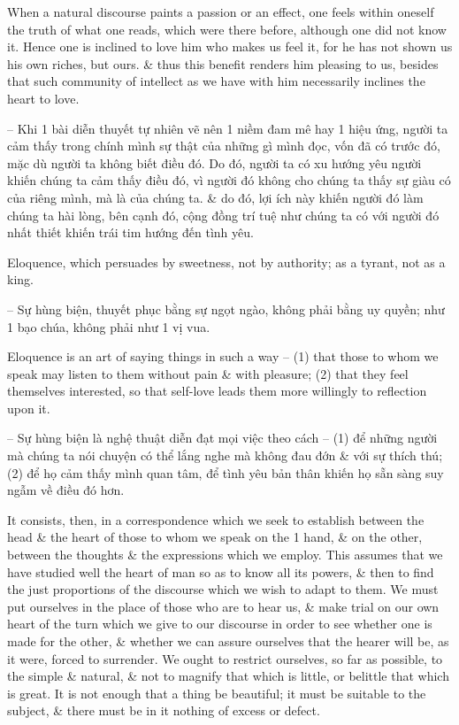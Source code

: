\documentclass{article}
\begin{document}
\begin{enumerate}
\begin{itemize}
		 When a natural discourse paints a passion or an effect, one feels within oneself the truth of what one reads, which were there before, although one did not know it. Hence one is inclined to love him who makes us feel it, for he has not shown us his own riches, but ours. \& thus this benefit renders him pleasing to us, besides that such community of intellect as we have with him necessarily inclines the heart to love.
		
		-- Khi 1 bài diễn thuyết tự nhiên vẽ nên 1 niềm đam mê hay 1 hiệu ứng, người ta cảm thấy trong chính mình sự thật của những gì mình đọc, vốn đã có trước đó, mặc dù người ta không biết điều đó. Do đó, người ta có xu hướng yêu người khiến chúng ta cảm thấy điều đó, vì người đó không cho chúng ta thấy sự giàu có của riêng mình, mà là của chúng ta. \& do đó, lợi ích này khiến người đó làm chúng ta hài lòng, bên cạnh đó, cộng đồng trí tuệ như chúng ta có với người đó nhất thiết khiến trái tim hướng đến tình yêu.
		
		 Eloquence, which persuades by sweetness, not by authority; as a tyrant, not as a king.
		
		-- Sự hùng biện, thuyết phục bằng sự ngọt ngào, không phải bằng uy quyền; như 1 bạo chúa, không phải như 1 vị vua.
		
		 Eloquence is an art of saying things in such a way -- (1) that those to whom we speak may listen to them without pain \& with pleasure; (2) that they feel themselves interested, so that self-love leads them more willingly to reflection upon it.
		
		-- Sự hùng biện là nghệ thuật diễn đạt mọi việc theo cách -- (1) để những người mà chúng ta nói chuyện có thể lắng nghe mà không đau đớn \& với sự thích thú; (2) để họ cảm thấy mình quan tâm, để tình yêu bản thân khiến họ sẵn sàng suy ngẫm về điều đó hơn.
		
		It consists, then, in a correspondence which we seek to establish between the head \& the heart of those to whom we speak on the 1 hand, \& on the other, between the thoughts \& the expressions which we employ. This assumes that we have studied well the heart of man so as to know all its powers, \& then to find the just proportions of the discourse which we wish to adapt to them. We must put ourselves in the place of those who are to hear us, \& make trial on our own heart of the turn which we give to our discourse in order to see whether one is made for the other, \& whether we can assure ourselves that the hearer will be, as it were, forced to surrender. We ought to restrict ourselves, so far as possible, to the simple \& natural, \& not to magnify that which is little, or belittle that which is great. It is not enough that a thing be beautiful; it must be suitable to the subject, \& there must be in it nothing of excess or defect.
		

\end{itemize}
\end{enumerate}
\end{document}
